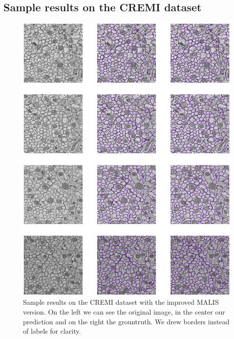 \subsection{Sample results on the CREMI dataset}
\begin{figure}[!htbp]
	\centering
	\includegraphics[width=0.88\linewidth]{./images/results_mosaic.png}
	\caption{Sample results on the CREMI dataset with the improved MALIS
	version. On the left we can see the original image, in the center our
prediction and on the right the grountruth. We drew borders instead of labels
for clarity.}%
	\label{fig:./images/results_mosaic}
\end{figure}
